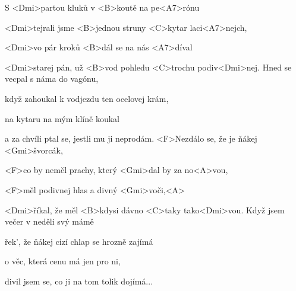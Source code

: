 

\zs
S <Dmi>partou kluků v <B>koutě na pe<A7>rónu

<Dmi>tejrali jsme <B>jednou struny <C>kytar laci<A7>nejch,

<Dmi>vo pár kroků <B>dál se na nás <A7>díval

<Dmi>starej pán, už <B>vod pohledu <C>trochu 
podiv<Dmi>nej.
\ks
\zs
Hned se vecpal s náma do vagónu,

když zahoukal k vodjezdu ten ocelovej krám,

na kytaru na mým klíně koukal

a za chvíli ptal se, jestli mu ji neprodám.
\ks
\zr
<F>Nezdálo se, že je ňákej <Gmi>švorcák,

<F>co by neměl prachy, který <Gmi>dal by za no<A>vou,

<F>měl podivnej hlas a divný <Gmi>voči,<A>

<Dmi>říkal, že měl <B>kdysi dávno <C>taky tako<Dmi>vou.
\kr
\zs
{}
\ks
\zr \kr
\zs
Když jsem večer v neděli svý mámě

řek', že ňákej cizí chlap se hrozně zajímá

o věc, která cenu má jen pro ni,

divil jsem se, co ji na tom tolik dojímá...
\ks
\kp
